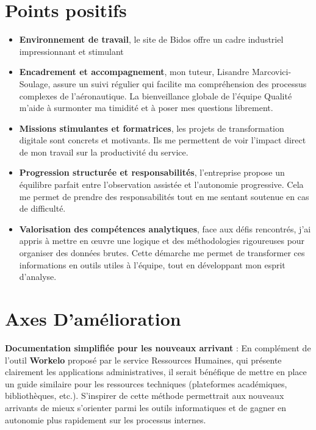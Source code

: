 \section*{Points positifs}
\begin{itemize}
  \item \textbf{Environnement de travail}, le site de Bidos offre un cadre industriel impressionnant et stimulant
  \item \textbf{Encadrement et accompagnement}, mon tuteur, Lisandre Marcovici-Soulage, assure un suivi régulier qui facilite ma compréhension des processus complexes de l'aéronautique. La bienveillance globale de l'équipe Qualité m'aide à surmonter ma timidité et à poser mes questions librement.
  \item \textbf{Missions stimulantes et formatrices}, les projets de transformation digitale sont concrets et motivants. Ils me permettent de voir l'impact direct de mon travail sur la productivité du service.
  \item \textbf{Progression structurée et responsabilités}, l'entreprise propose un équilibre parfait entre l'observation assistée et l'autonomie progressive. Cela me permet de prendre des responsabilités tout en me sentant soutenue en cas de difficulté.
  \item \textbf{Valorisation des compétences analytiques}, face aux défis rencontrés, j’ai appris à mettre en œuvre une logique et des méthodologies rigoureuses pour organiser des données brutes. Cette démarche me permet de transformer ces informations en outils utiles à l'équipe, tout en développant mon esprit d'analyse.
\end{itemize}

\section*{Axes D'amélioration}
\textbf{Documentation simplifiée pour les nouveaux arrivant }: En complément de l’outil \textbf{Workelo} proposé par le service Ressources Humaines, qui présente clairement les applications administratives, il serait bénéfique de mettre en place un guide similaire pour les ressources techniques (plateformes académiques, bibliothèques, etc.). S'inspirer de cette méthode permettrait aux nouveaux arrivants de mieux s'orienter parmi les outils informatiques et de gagner en autonomie plus rapidement sur les processus internes.
	
